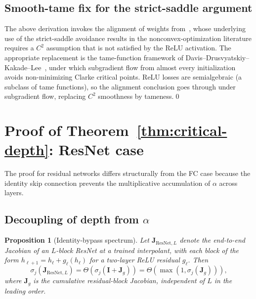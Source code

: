 \documentclass[12pt]{amsart}
\newtheorem{proposition}[theorem]{Proposition}
\theoremstyle{definition}
\theoremstyle{remark}
\newcommand{\bJ}{\mathbf{J}}
\newcommand{\bI}{\mathbf{I}}
\begin{document}
\subsection{Smooth-tame fix for the strict-saddle argument}

The above derivation invokes the alignment of weights from~\cite{paperB},
whose underlying use of the strict-saddle avoidance results in the
nonconvex-optimization literature requires a $C^{2}$ assumption that is
not satisfied by the ReLU activation. The appropriate replacement is
the tame-function framework of Davis--Drusvyatskiy--Kakade--Lee~\cite{DDKL2020},
under which subgradient flow from almost every initialization avoids
non-minimizing Clarke critical points. ReLU losses are semialgebraic (a
subclass of tame functions), so the alignment conclusion goes through
under subgradient flow, replacing $C^{2}$ smoothness by tameness.\qed

\section{Proof of Theorem~\ref{thm:critical-depth}: ResNet
  case}\label{sec:ld-resnet}

The proof for residual networks differs structurally from the FC case
because the identity skip connection prevents the multiplicative
accumulation of $\alpha$ across layers.

\subsection{Decoupling of depth from $\alpha$}

\begin{proposition}[Identity-bypass spectrum]\label{prop:resnet-spectrum}
Let $\bJ_{\mathrm{ResNet}, L}$ denote the end-to-end Jacobian of an
$L$-block ResNet at a trained interpolant, with each block of the form
$h_{\ell+1} = h_{\ell} + g_{\ell}(h_{\ell})$ for a two-layer ReLU residual
$g_{\ell}$. Then
\[
  \sigma_{j}(\bJ_{\mathrm{ResNet}, L})
  = \Theta(\sigma_{j}(\bI + \bJ_{g}))
  = \Theta(\max(1, \sigma_{j}(\bJ_{g}))),
\]
where $\bJ_{g}$ is the cumulative residual-block Jacobian, independent of
$L$ in the leading order.
\end{proposition}
\end{document}
